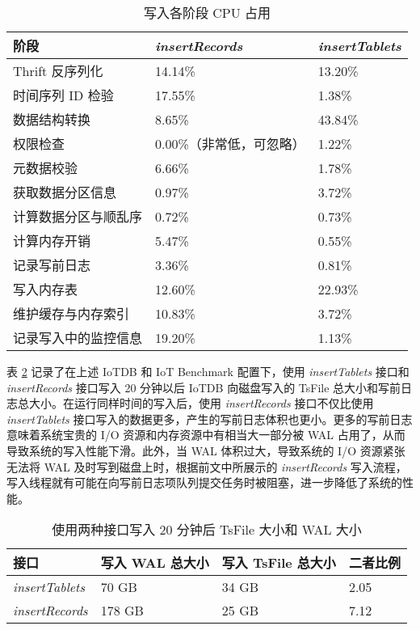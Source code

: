 \begin{table}
  \caption{写入各阶段 CPU 占用}
  \centering
  \begin{tabular}{lll}
  \toprule
  阶段 &  \emph{insertRecords} & \emph{insertTablets} \\
  \midrule
      Thrift 反序列化 &  14.14\% & 13.20\% \\ 
      时间序列 ID 检验 & 17.55\% & 1.38\% \\ 
      数据结构转换 &  8.65\% & 43.84\% \\ 
       权限检查 & 0.00\%（非常低，可忽略） &  1.22\%\\ 
      元数据校验 &  6.66\% & 1.78\% \\ 
      获取数据分区信息 &  0.97\% & 3.72\% \\
      计算数据分区与顺乱序 &  0.72\%&  0.73\%  \\
      计算内存开销 & 5.47\% & 0.55\% \\
      记录写前日志 & 3.36\% & 0.81\%\\
      写入内存表 & 12.60\% & 22.93\% \\
      维护缓存与内存索引 & 10.83\% & 3.72\% \\
      记录写入中的监控信息 & 19.20\% & 1.13\%\\
  \bottomrule
  \end{tabular}
  \label{tabular:insert-records-profile-result}
\end{table}

表 \ref{tabular:wal-vs-tsfile-size} 记录了在上述 IoTDB 和 IoT Benchmark 配置下，使用 \emph{insertTablets} 接口和 \emph{insertRecords} 接口写入 20 分钟以后 IoTDB 向磁盘写入的 TsFile 总大小和写前日志总大小。在运行同样时间的写入后，使用 \emph{insertRecords} 接口不仅比使用 \emph{insertTablets} 接口写入的数据更多，产生的写前日志体积也更小。更多的写前日志意味着系统宝贵的 I/O 资源和内存资源中有相当大一部分被 WAL 占用了，从而导致系统的写入性能下滑。此外，当 WAL 体积过大，导致系统的 I/O 资源紧张无法将 WAL 及时写到磁盘上时，根据前文中所展示的 \emph{insertRecords} 写入流程，写入线程就有可能在向写前日志项队列提交任务时被阻塞，进一步降低了系统的性能。


\begin{table}
  \caption{使用两种接口写入 20 分钟后 TsFile 大小和 WAL 大小}
  \centering
  \begin{tabular}{llll}
  \toprule 
  接口 & 写入 WAL 总大小 & 写入 TsFile 总大小 & 二者比例 \\
  \midrule 
  \emph{insertTablets} &  70 GB & 34 GB &  2.05 \\
  \emph{insertRecords} & 178 GB & 25 GB & 7.12 \\
  \bottomrule
  \end{tabular}
  \label{tabular:wal-vs-tsfile-size}
\end{table}


